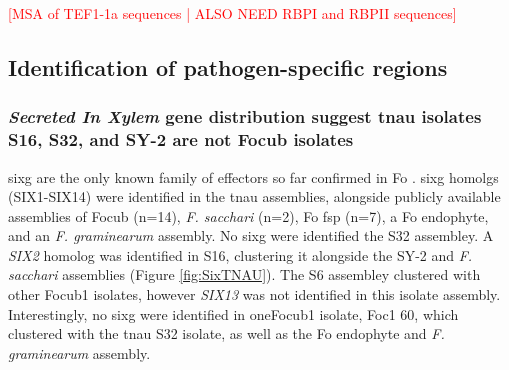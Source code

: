 \textcolor{red}{[MSA of TEF1-1a sequences | ALSO NEED RBPI and RBPII sequences]}

\subsection{Identification of pathogen-specific regions}

\subsubsection{\textit{Secreted In Xylem} gene distribution suggest \ac{tnau} isolates S16, S32, and SY-2 are not \ac{Focub} isolates}

\Ac{sixg} are the only known family of effectors so far confirmed in \ac{Fo} \parencite{Armitage2018}. \Ac{sixg} homolgs (SIX1-SIX14) were identified in the \ac{tnau} assemblies, alongside publicly available assemblies of \ac{Focub} (n=14), \textit{F. sacchari} (n=2), \ac{Fo} \ac{fsp} (n=7), a \ac{Fo} endophyte, and an \textit{F. graminearum} assembly. No \ac{sixg} were identified the S32 assembley. A \textit{SIX2} homolog was identified in S16, clustering it alongside the SY-2 and \textit{F. sacchari} assemblies (Figure \ref{fig:SixTNAU}). The S6 assembley clustered with other \ac{Focub1} isolates, however \textit{SIX13} was not identified in this isolate assembly. Interestingly, no \ac{sixg} were identified in one\ac{Focub1} isolate, Foc1 60, which clustered with the \ac{tnau} S32 isolate, as well as the \ac{Fo} endophyte and \textit{F. graminearum} assembly. 

